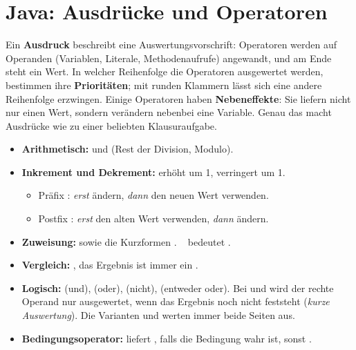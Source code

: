 \section{Java: Ausdrücke und Operatoren}
\worum
Ein \textbf{Ausdruck} beschreibt eine Auswertungsvorschrift: Operatoren werden auf Operanden (Variablen, Literale, Methodenaufrufe) angewandt, und am Ende steht ein Wert. In welcher Reihenfolge die Operatoren ausgewertet werden, bestimmen ihre \textbf{Prioritäten}; mit runden Klammern lässt sich eine andere Reihenfolge erzwingen. Einige Operatoren haben \textbf{Nebeneffekte}: Sie liefern nicht nur einen Wert, sondern verändern nebenbei eine Variable. Genau das macht Ausdrücke wie  zu einer beliebten Klausuraufgabe.

\begin{merke}
\begin{itemize}[itemsep=0.1em]
\item \textbf{Arithmetisch:} \code{+ - * /} und \code{\%} (Rest der Division, Modulo).
\item \textbf{Inkrement und Dekrement:} \code{++} erhöht um 1, \code{--} verringert um 1.
	\begin{itemize}[itemsep=0em]
	\item Präfix : \emph{erst} ändern, \emph{dann} den neuen Wert verwenden.
	\item Postfix : \emph{erst} den alten Wert verwenden, \emph{dann} ändern.
	\end{itemize}
\item \textbf{Zuweisung:} \code{=} sowie die Kurzformen \code{+= -= *= /= \%=}. \  bedeutet .
\item \textbf{Vergleich:} \code{== != < <= > >=}, das Ergebnis ist immer ein .
\item \textbf{Logisch:} \code{\&\&} (und), \code{||} (oder), \code{!} (nicht), \code{\textasciicircum} (entweder oder). Bei \code{\&\&} und \code{||} wird der rechte Operand nur ausgewertet, wenn das Ergebnis noch nicht feststeht (\emph{kurze Auswertung}). Die Varianten \code{\&} und \code{|} werten immer beide Seiten aus.
\item \textbf{Bedingungsoperator:}  liefert , falls die Bedingung wahr ist, sonst .
\end{itemize}
\end{merke}

